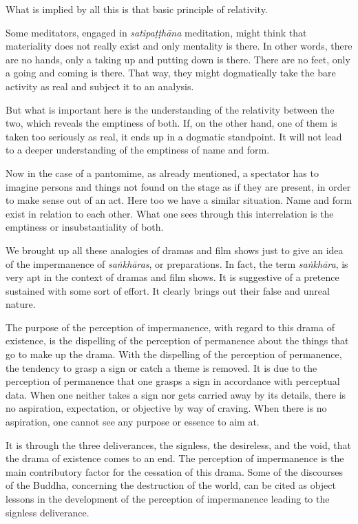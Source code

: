 What is implied by all this is that basic principle of relativity.

Some meditators, engaged in \emph{satipaṭṭhāna} meditation, might think that materiality does not really exist and only mentality is there. In other words, there are no hands, only a taking up and putting down is there. There are no feet, only a going and coming is there. That way, they might dogmatically take the bare activity as real and subject it to an analysis.

But what is important here is the understanding of the relativity between the two, which reveals the emptiness of both. If, on the other hand, one of them is taken too seriously as real, it ends up in a dogmatic standpoint. It will not lead to a deeper understanding of the emptiness of name and form.

Now in the case of a pantomime, as already mentioned, a spectator has to imagine persons and things not found on the stage as if they are present, in order to make sense out of an act. Here too we have a similar situation. Name and form exist in relation to each other. What one sees through this interrelation is the emptiness or insubstantiality of both.

We brought up all these analogies of dramas and film shows just to give an idea of the impermanence of \emph{saṅkhāras}, or preparations. In fact, the term \emph{saṅkhāra}, is very apt in the context of dramas and film shows. It is suggestive of a pretence sustained with some sort of effort. It clearly brings out their false and unreal nature.

The purpose of the perception of impermanence, with regard to this drama of existence, is the dispelling of the perception of permanence about the things that go to make up the drama. With the dispelling of the perception of permanence, the tendency to grasp a sign or catch a theme is removed. It is due to the perception of permanence that one grasps a sign in accordance with perceptual data. When one neither takes a sign nor gets carried away by its details, there is no aspiration, expectation, or objective by way of craving. When there is no aspiration, one cannot see any purpose or essence to aim at.

It is through the three deliverances, the signless, the desireless, and the void, that the drama of existence comes to an end. The perception of impermanence is the main contributory factor for the cessation of this drama. Some of the discourses of the Buddha, concerning the destruction of the world, can be cited as object lessons in the development of the perception of impermanence leading to the signless deliverance.

